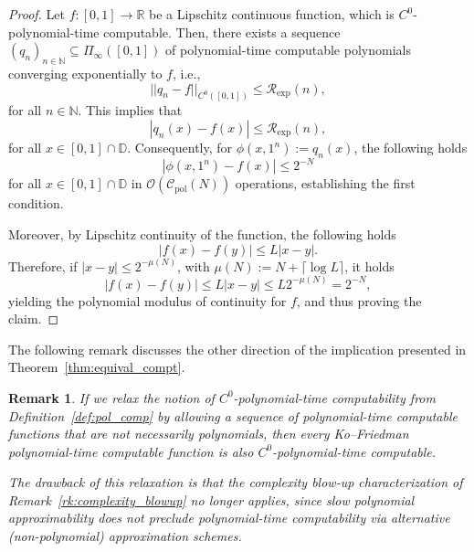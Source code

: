\documentclass[pdflatex]{sn-jnl}%
\newtheorem{remark}[theorem]{Remark}
\begin{document}
\begin{proof}
Let $f:[0,1]\rightarrow\mathbb{R}$ be a Lipschitz continuous function, which is $C^0$-polynomial-time computable. Then, there exists a sequence $(q_n)_{n\in \mathbb{N}}\subseteq \Pi_\infty([0,1])$ of polynomial-time computable polynomials converging exponentially to $f$, i.e., 
    \begin{equation}
        ||q_n-f||_{C^0([0,1])}\leq \mathcal{R}_{\textrm{exp}}(n),
    \end{equation}
    for all $n\in \mathbb{N}$. This implies that 
    \begin{equation}
        |q_n(x)-f(x)|\leq \mathcal{R}_{\textrm{exp}}(n),
    \end{equation}
    for all $x\in [0,1]\cap \mathbb{D}$. Consequently, for $\phi(x,1^n):=q_n(x)$, the following holds 
    \begin{equation}
        |\phi(x,1^n)-f(x)|\leq 2^{-N}
    \end{equation}
    for all $x\in [0,1]\cap\mathbb{D}$ in $\mathcal{O}(\mathcal{C}_\textrm{pol}(N))$ operations, establishing the first condition. 
    
    Moreover, by Lipschitz continuity of the function, the following holds
    \begin{equation}
        |f(x)-f(y)|\leq L|x-y|.
    \end{equation}
    Therefore, if $|x-y|\leq 2^{-\mu(N)}$, with $\mu(N):=N+\lceil\log L\rceil$, it holds
    \begin{equation}
        |f(x)-f(y)|\leq L|x-y|\leq L2^{-\mu(N)} = 2^{-
        N},
    \end{equation}
    yielding the polynomial modulus of continuity for $f$, and thus proving the claim.  
\end{proof}
The following remark discusses the other direction of the implication presented in Theorem~\ref{thm:equival_compt}.
\begin{remark}\label{remark_iff}
If we relax the notion of $C^0$-polynomial-time computability from
Definition~\ref{def:pol_comp} by allowing a sequence of polynomial-time computable functions that are not necessarily polynomials, then every Ko–Friedman polynomial-time computable function is also $C^0$-polynomial-time computable.

The drawback of this relaxation is that the complexity blow-up characterization
of Remark~\ref{rk:complexity_blowup} no longer applies, since slow polynomial
approximability does not preclude polynomial-time computability via alternative
(non-polynomial) approximation schemes.
\end{remark}
\end{document}
